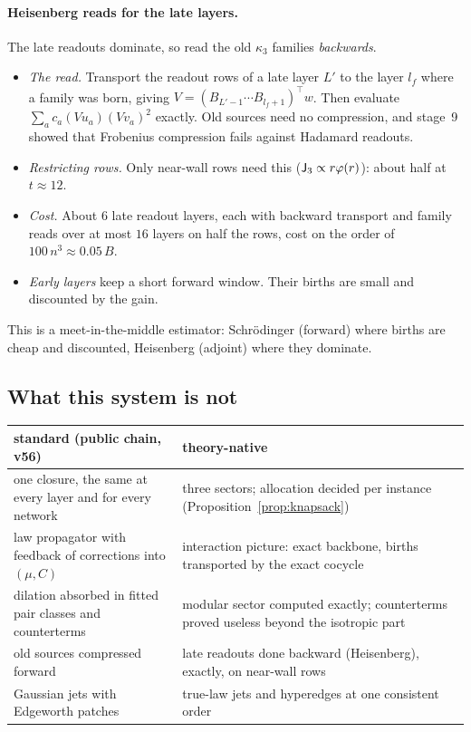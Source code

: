 \paragraph{Heisenberg reads for the late layers.} The late readouts dominate, so read the old $\kappa_3$ families \emph{backwards}.
\begin{itemize}[leftmargin=*]
\item \emph{The read.} Transport the readout rows of a late layer $L'$ to the layer $l_f$ where a family was born, giving
$V=(B_{L'-1}\cdots B_{l_f+1})^\top w$. Then evaluate $\sum_ac_a(V u_a)(Vv_a)^2$ exactly. Old sources need no compression, and stage~9 showed
that Frobenius compression fails against Hadamard readouts.
\item \emph{Restricting rows.} Only near-wall rows need this ($\mathsf J_3\propto r\varphi(r)$): about half at $t\approx12$.
\item \emph{Cost.} About $6$ late readout layers, each with backward transport and family reads over at most $16$ layers on half the
rows, cost on the order of $100\,n^3\approx0.05\,B$.
\item \emph{Early layers} keep a short forward window. Their births are small and discounted by the gain.
\end{itemize}
This is a meet-in-the-middle estimator: Schrödinger (forward) where births are cheap and discounted, Heisenberg (adjoint) where they
dominate.

\subsection{What this system is not}
\begin{center}\small
\begin{tabular}{>{\raggedright\arraybackslash}p{6.4cm}>{\raggedright\arraybackslash}p{7.6cm}}\toprule
standard (public chain, v56) & theory-native\\\midrule
one closure, the same at every layer and for every network & three sectors; allocation decided per instance (Proposition~\ref{prop:knapsack})\\
law propagator with feedback of corrections into $(\mu,C)$ & interaction picture: exact backbone, births transported by the exact cocycle\\
dilation absorbed in fitted pair classes and counterterms & modular sector computed exactly; counterterms proved useless beyond the isotropic part\\
old sources compressed forward & late readouts done backward (Heisenberg), exactly, on near-wall rows\\
Gaussian jets with Edgeworth patches & true-law jets and hyperedges at one consistent order\\\bottomrule
\end{tabular}
\end{center}

